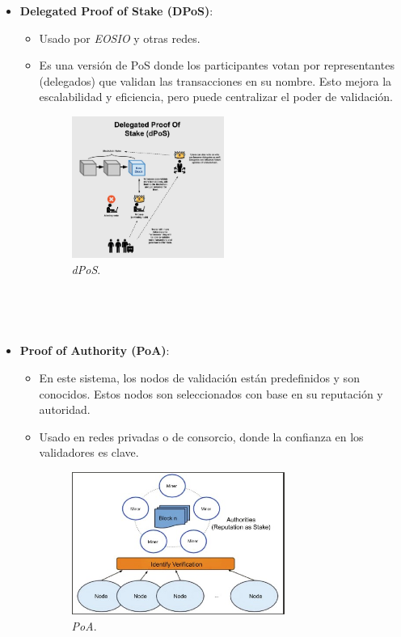 \begin{itemize}
    \item \textbf{Delegated Proof of Stake (DPoS)}:
    \begin{itemize}
        \item Usado por \textit{EOSIO} \cite{eosio} y otras redes.
        \item Es una versión de PoS donde los participantes votan por representantes (delegados) que validan las transacciones en su nombre. Esto mejora la escalabilidad y eficiencia, pero puede centralizar el poder de validación.
        \begin{figure}[!htbp]
            \centering
            \includegraphics[width=0.5\textwidth]{./Graphics/dPoS.png}
            \caption{\textit{dPoS}.}
            \label{fig:dPoS}
        \end{figure}
    \end{itemize}

\

\

    \item \textbf{Proof of Authority (PoA)}:
    \begin{itemize}
        \item En este sistema, los nodos de validación están predefinidos y son conocidos. Estos nodos son seleccionados con base en su reputación y autoridad.
        \item Usado en redes privadas o de consorcio, donde la confianza en los validadores es clave.
        \begin{figure}[!htbp]
            \centering
            \includegraphics[width=0.7\textwidth]{./Graphics/PoA.png}
            \caption{\textit{PoA}.}
            \label{fig:Po}
        \end{figure}
    \end{itemize}

\end{itemize}

